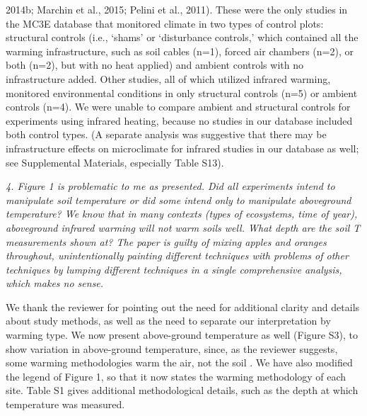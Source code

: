 \documentclass[11pt,a4paper]{letter}
\begin{document}
\begin{letter}{}
2014b; Marchin et al., 2015; Pelini et al., 2011). These were the only studies in the MC3E database that
monitored climate in two types of control plots: structural controls (i.e., `shams' or `disturbance controls,'
which contained all the warming infrastructure, such as soil cables (n=1), forced air chambers (n=2), or both
(n=2), but with no heat applied) and ambient controls with no infrastructure added. Other studies, all of
which utilized infrared warming, monitored environmental conditions in only structural controls (n=5) or
ambient controls (n=4). We were unable to compare ambient and structural controls for experiments using
infrared heating, because no studies in our database included both control types. (A separate analysis was
 suggestive that there may be infrastructure effects on microclimate for infrared studies in our database as
well; see Supplemental Materials, especially Table S13).
\\
\par \emph{4. Figure 1 is problematic to me as presented. Did all experiments intend to manipulate soil temperature or did some intend only to manipulate aboveground temperature? We know that in many contexts (types of ecosystems, time of year), aboveground infrared warming will not warm soils well. What depth are the soil T measurements shown at? The paper is guilty of mixing apples and oranges throughout, unintentionally painting different techniques with problems of other techniques by lumping different techniques in a single comprehensive analysis, which makes no sense.}
\par We thank the reviewer for pointing out the need for additional clarity and details about study methods, as well as the need to separate our interpretation by warming type. We now present above-ground temperature as well (Figure S3), to show variation in above-ground temperature, since, as the reviewer suggests, some warming methodologies warm the air, not the soil . We have also modified the legend of Figure 1, so that it now states the warming methodology of each site. Table S1 gives additional methodological details, such as the depth at which temperature was measured.
\\


\end{letter}
\end{document}
